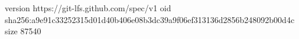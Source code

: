 version https://git-lfs.github.com/spec/v1
oid sha256:a9e91c33252315d01d40b406e08b3dc39a9f06ef313136d2856b248092b00d4c
size 87540
